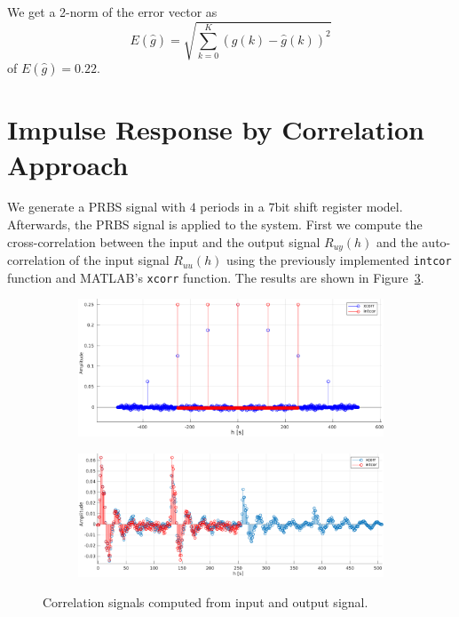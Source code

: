 \documentclass{scrartcl}
\begin{document}
We get a 2-norm of the error vector as
\begin{equation}\label{eq:2-norm}
	E(\hat{g}) = \sqrt{\sum\limits_{k=0}^K \left(g(k) - \hat{g}(k)\right)^2}
\end{equation}
of $E(\hat{g}) = 0.22$.

\section{Impulse Response by Correlation Approach}
We generate a PRBS signal with $4$ periods in a $7$bit shift register model.
Afterwards, the PRBS signal is applied to the system.
First we compute the cross-correlation between the input and the output signal $R_{uy}(h)$ and the auto-correlation of the input signal $R_{uu}(h)$ using the previously implemented \texttt{intcor} function and MATLAB's \texttt{xcorr} function. The results are shown in Figure~\ref{fig:cross_correlations}.
\begin{figure}[h]
	\centering
	\begin{subfigure}{0.6\textwidth}
		\includegraphics[width=\textwidth]{figures/ac.pdf}
		\label{fig:cc_ac}
	\end{subfigure}
	\begin{subfigure}{0.6\textwidth}
		\includegraphics[width=\textwidth]{figures/cc.pdf}
		\label{fig:cc_cc}
	\end{subfigure}
	\caption{Correlation signals computed from input and output signal.}\label{fig:cross_correlations}
\end{figure}
\end{document}
